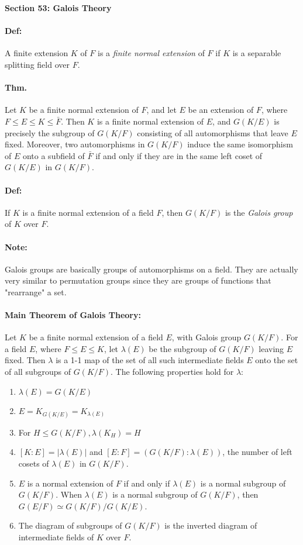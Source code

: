 \documentclass[10pt,a4paper]{article}
\begin{document}
\begin{center}
\textbf{Section 53: Galois Theory}
\end{center}

\paragraph{Def:} A finite extension $K$ of $F$ is a \textit{finite normal extension} of $F$ if $K$ is a separable splitting field over $F$.

\paragraph{Thm.} Let $K$ be a finite normal extension of $F$, and let $E$ be an extension of $F$, where $F \leq E \leq K \leq \bar{F}$. Then $K$ is a finite normal extension of $E$, and $G(K/E)$ is precisely the subgroup of $G(K/F)$ consisting of all automorphisms that leave $E$ fixed. Moreover, two automorphisms in $G(K/F)$ induce the same isomorphism of $E$ onto a subfield of $\bar{F}$ if and only if they are in the same left coset of $G(K/E)$ in $G(K/F)$.

\paragraph{Def:} If $K$ is a finite normal extension of a field $F$, then $G(K/F)$ is the \textit{Galois group} of $K$ over $F$.

\paragraph{Note:} Galois groups are basically groups of automorphisms on a field. They are actually very similar to permutation groups since they are groups of functions that "rearrange" a set.

\paragraph{Main Theorem of Galois Theory:} Let $K$ be a finite normal extension of a field $E$, with Galois group $G(K/F)$. For a field $E$, where $F \leq E \leq K$, let $\lambda(E)$ be the subgroup of $G(K/F)$ leaving $E$ fixed. Then $\lambda$ is a 1-1 map of the set of all such intermediate fields $E$ onto the set of all subgroups of $G(K/F)$. The following properties hold for $\lambda$:
\begin{enumerate}
\item $\lambda(E) = G(K/E)$
\item $E = K_{G(K/E)} = K_{\lambda(E)}$
\item For $H \leq G(K/F), \lambda(K_H) = H$
\item $[K:E] = |\lambda(E)|$ and $[E:F] = (G(K/F): \lambda(E))$, the number of left cosets of $\lambda(E)$ in $G(K/F)$.
\item $E$ is a normal extension of $F$ if and only if $\lambda(E)$ is a normal subgroup of $G(K/F)$. When $\lambda(E)$ is a normal subgroup of $G(K/F)$, then $G(E/F) \simeq G(K/F)/G(K/E)$.
\item The diagram of subgroups of $G(K/F)$ is the inverted diagram of intermediate fields of $K$ over $F$.
\end{enumerate}
\end{document}
